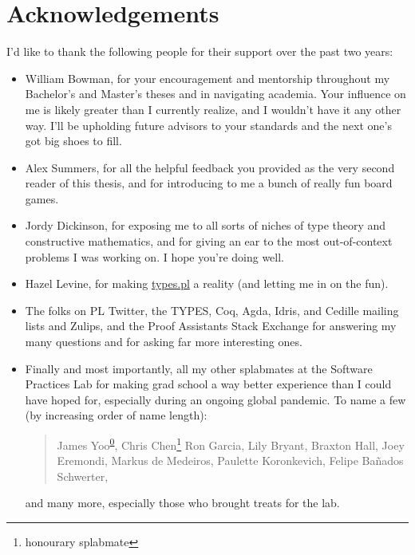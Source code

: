 \chapter{Acknowledgements}

I'd like to thank the following people for their support over the past two years:

\begin{itemize}
  \item William Bowman, for your encouragement and mentorship throughout my Bachelor's and Master's theses
    and in navigating academia.
    Your influence on me is likely greater than I currently realize,
    and I wouldn't have it any other way.
    I'll be upholding future advisors to your standards and the next one's got big shoes to fill.
  \item Alex Summers, for all the helpful feedback you provided as the very second reader of this thesis,
    and for introducing to me a bunch of really fun board games.
  \item Jordy Dickinson, for exposing me to all sorts of niches of type theory and constructive mathematics,
    and for giving an ear to the most out-of-context problems I was working on.
    I hope you're doing well.
  \item Hazel Levine, for making \href{https://types.pl/}{types.pl} a reality (and letting me in on the fun).
  \item The folks on PL Twitter, the TYPES, Coq, Agda, Idris, and Cedille mailing lists and Zulips,
    and the Proof Assistants Stack Exchange for answering my many questions
    and for asking far more interesting ones.
  \item Finally and most importantly, all my other splabmates at the Software Practices Lab
    for making grad school a way better experience than I could have hoped for,
    especially during an ongoing global pandemic.
    To name a few (by increasing order of name length):
    \vspace{-0.25\baselineskip}
    \begin{quote} \small
    James Yoo\textsuperscript{\href{https://youtu.be/dQw4w9WgXcQ}{0}}, Chris Chen\punctstack{,}\footnote{honourary splabmate}
    Ron Garcia, Lily Bryant, Braxton Hall, Joey Eremondi, Markus de Medeiros, Paulette Koronkevich, Felipe Ba\~nados Schwerter,
    \end{quote}
    \vspace{-0.5\baselineskip}
    and many more, especially those who brought treats for the lab.
\end{itemize}

\vfill

